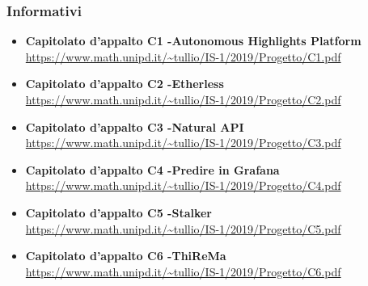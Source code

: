 \subsubsection{Informativi}

\begin{itemize}
\item \textbf {Capitolato d'appalto C1 -Autonomous Highlights Platform}\\
\url{https://www.math.unipd.it/~tullio/IS-1/2019/Progetto/C1.pdf}
\item \textbf {Capitolato d'appalto C2 -Etherless}\\
\url{https://www.math.unipd.it/~tullio/IS-1/2019/Progetto/C2.pdf}
\item \textbf {Capitolato d'appalto C3 -Natural API}\\
\url{https://www.math.unipd.it/~tullio/IS-1/2019/Progetto/C3.pdf}
\item \textbf {Capitolato d'appalto C4 -Predire in Grafana}\\
\url{https://www.math.unipd.it/~tullio/IS-1/2019/Progetto/C4.pdf}
\item \textbf {Capitolato d'appalto C5 -Stalker}\\
\url{https://www.math.unipd.it/~tullio/IS-1/2019/Progetto/C5.pdf}
\item \textbf {Capitolato d'appalto C6 -ThiReMa}\\
\url{https://www.math.unipd.it/~tullio/IS-1/2019/Progetto/C6.pdf}

\end{itemize}